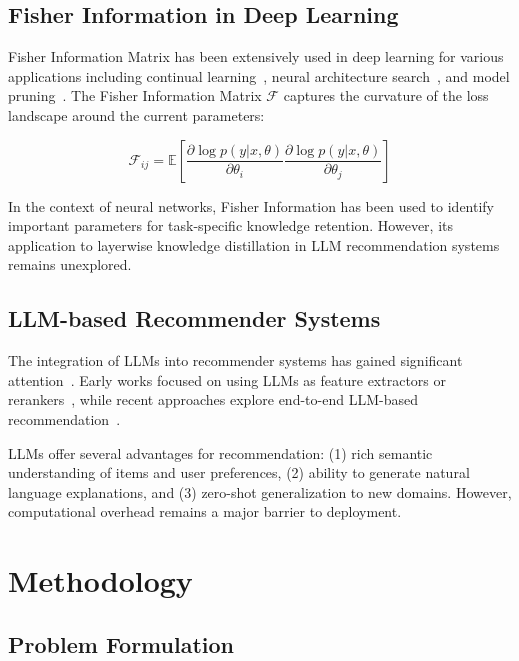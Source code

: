\documentclass[10pt,conference]{IEEEtran}
\newcommand{\fisher}{\mathcal{F}}
\begin{document}
\subsection{Fisher Information in Deep Learning}

Fisher Information Matrix has been extensively used in deep learning for various applications including continual learning~\cite{kirkpatrick2017overcoming}, neural architecture search~\cite{turner2019blockwise}, and model pruning~\cite{theis2018faster}. The Fisher Information Matrix $\fisher$ captures the curvature of the loss landscape around the current parameters:

\begin{equation}
\fisher_{ij} = \mathbb{E}\left[\frac{\partial \log p(y|x,\theta)}{\partial \theta_i} \frac{\partial \log p(y|x,\theta)}{\partial \theta_j}\right]
\end{equation}

In the context of neural networks, Fisher Information has been used to identify important parameters for task-specific knowledge retention. However, its application to layerwise knowledge distillation in LLM recommendation systems remains unexplored.

\subsection{LLM-based Recommender Systems}

The integration of LLMs into recommender systems has gained significant attention~\cite{zhao2023llm4rec,li2023llm4rec}. Early works focused on using LLMs as feature extractors or rerankers~\cite{hou2022towards}, while recent approaches explore end-to-end LLM-based recommendation~\cite{geng2022recommendation}.

LLMs offer several advantages for recommendation: (1) rich semantic understanding of items and user preferences, (2) ability to generate natural language explanations, and (3) zero-shot generalization to new domains. However, computational overhead remains a major barrier to deployment.

\section{Methodology}

\subsection{Problem Formulation}
\end{document}

